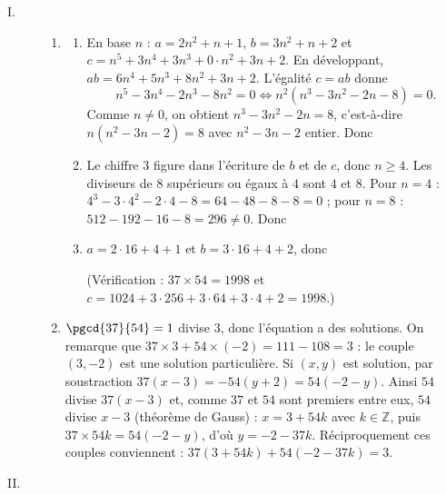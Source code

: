 \begin{description}
	\item[I. ]
	\begin{enumerate}
		\item
		\begin{enumerate}
			\item {}
				En base $n$ : $a = 2n^2 + n + 1$, $b = 3n^2 + n + 2$ et $c = n^5 + 3n^4 + 3n^3 + 0\cdot n^2 + 3n + 2$.
				En développant, $ab = 6n^4 + 5n^3 + 8n^2 + 3n + 2$. L'égalité $c = ab$ donne
				\[
					n^5 - 3n^4 - 2n^3 - 8n^2 = 0
					\iff n^2\left(n^3 - 3n^2 - 2n - 8\right) = 0 .
				\]
				Comme $n \neq 0$, on obtient $n^3 - 3n^2 - 2n = 8$, c'est-à-dire $n\left(n^2 - 3n - 2\right) = 8$ avec $n^2-3n-2$ entier.
				Donc \par\noindent{}
			\item {}
				Le chiffre $3$ figure dans l'écriture de $b$ et de $c$, donc $n \geq 4$. Les diviseurs de $8$ supérieurs ou égaux à $4$ sont $4$ et $8$.
				Pour $n = 4$ : $4^3 - 3\cdot 4^2 - 2\cdot 4 - 8 = 64 - 48 - 8 - 8 = 0$ ; pour $n = 8$ : $512 - 192 - 16 - 8 = 296 \neq 0$.
				Donc \par\noindent{}
			\item {}
				$a = 2\cdot 16 + 4 + 1$ et $b = 3 \cdot 16 + 4 + 2$, donc \par\noindent{}
				(Vérification : $37 \times 54 = 1998$ et $c = 1024 + 3\cdot 256 + 3 \cdot 64 + 3\cdot 4 + 2 = 1998$.)
		\end{enumerate}
		\item {}
			$\pgcd{37}{54} = 1$ divise $3$, donc l'équation a des solutions.
			On remarque que $37 \times 3 + 54 \times (-2) = 111 - 108 = 3$ : le couple $(3,-2)$ est une solution particulière.
			Si $(x,y)$ est solution, par soustraction $37(x-3) = -54(y+2) = 54(-2-y)$.
			Ainsi $54$ divise $37(x-3)$ et, comme $37$ et $54$ sont premiers entre eux, $54$ divise $x-3$ (théorème de Gauss) :
			$x = 3 + 54k$ avec $k \in \mathbb{Z}$, puis $37 \times 54 k = 54(-2-y)$, d'où $y = -2 - 37k$.
			Réciproquement ces couples conviennent : $37(3+54k) + 54(-2-37k) = 3$.
			\par\noindent{}
	\end{enumerate}
	\item[II. ]
	\begin{enumerate}

\end{enumerate}
\end{description}
